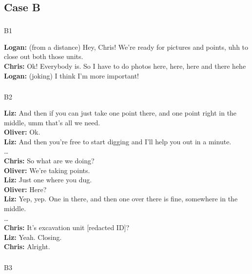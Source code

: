\documentclass[
  canadian,
]{article}
\makeatletter
\let\oldsubparagraph\subparagraph
\renewcommand{\subparagraph}{
    \@ifstar
      \xxxSubParagraphStar
      \xxxSubParagraphNoStar
  }
\newcommand{\xxxSubParagraphStar}[1]{\oldsubparagraph*{#1}\mbox{}}
\newcommand{\xxxSubParagraphNoStar}[1]{\oldsubparagraph{#1}\mbox{}}
\makeatother
\begin{document}
\subsection{Case B}\label{case-b}

\subparagraph{B1}\label{sec-B1}

\textbf{Logan:} (from a distance) Hey, Chris! We're ready for pictures
and points, uhh to close out both those units.\\
\textbf{Chris:} Ok! Everybody is. So I have to do photos here, here,
here and there hehe\\
\textbf{Logan:} (joking) I think I'm more important!

\subparagraph{B2}\label{sec-B2}

\textbf{Liz:} And then if you can just take one point there, and one
point right in the middle, umm that's all we need.\\
\textbf{Oliver:} Ok.\\
\textbf{Liz:} And then you're free to start digging and I'll help you
out in a minute.\\
\ldots{}\\
\textbf{Chris:} So what are we doing?\\
\textbf{Oliver:} We're taking points.\\
\textbf{Liz:} Just one where you dug.\\
\textbf{Oliver:} Here?\\
\textbf{Liz:} Yep, yep. One in there, and then one over there is fine,
somewhere in the middle.\\
\ldots{}\\
\textbf{Chris:} It's excavation unit {[}redacted ID{]}?\\
\textbf{Liz:} Yeah. Closing.\\
\textbf{Chris:} Alright.

\subparagraph{B3}\label{sec-B3}
\end{document}
